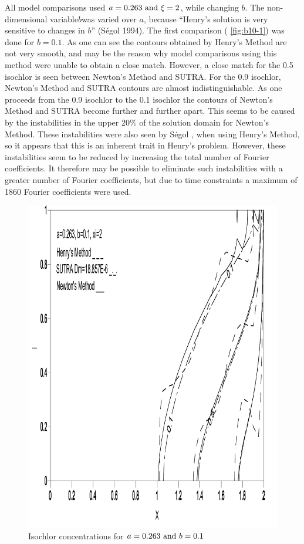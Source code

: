 All model comparisons used $a = 0.263 \text{ and } \xi =2$, while changing $b$. The non-dimensional
variable$b$was varied over $a$, because ``Henry's solution is very sensitive to changes in $b$''
(S\'egol 1994). The first comparison ( \autoref{fig:b10-1}) was done for $b=0.1$. As one
can see the contours obtained by Henry's Method are not very smooth, and may be the reason why model
comparisons using this method were unable to obtain a close match.  However, a close match for the
0.5 isochlor is seen between Newton's Method and SUTRA. For the 0.9 isochlor, Newton's Method and
SUTRA contours are almost indistinguishable. As one proceeds from the 0.9 isochlor to the 0.1
isochlor the contours of Newton's Method and SUTRA become further and further apart. This seems to
be caused by the instabilities in the upper 20\% of the solution domain for Newton's Method. These
instabilities were also seen by S\'egol \cite{Segol}, when using Henry's Method, so it appears that
this is an inherent trait in Henry's problem. However, these instabilities seem to be reduced by
increasing the total number of Fourier coefficients. It therefore may be possible to eliminate such
instabilities with a greater number of Fourier coefficients, but due to time constraints a maximum
of 1860 Fourier coefficients were used.

\begin{figure}[htp] \centering
    \includegraphics[totalheight=0.45 \textheight,viewport=3mm 4mm 205mm 292mm]
    {image2}
    \caption{Isochlor concentrations for $a = 0.263 \text{ and } b =
    0.1$} \label{fig:b10-1}
\end{figure}


